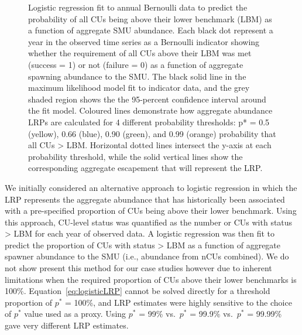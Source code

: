\documentclass[11pt]{book}
\begin{document}
\begin{figure}[htb]

{\centering {} 

}

\caption{Logistic regression fit to annual Bernoulli data to predict the probability of all CUs being above their lower benchmark (LBM) as a function of aggregate SMU abundance. Each black dot represent a year in the observed time series as a Bernoulli indicator showing whether the requirement of all CUs above their LBM was met (success = 1) or not (failure = 0) as a function of aggregate spawning abundance to the SMU. The black solid line in the maximum likelihood model fit to indicator data, and the grey shaded region shows the the 95-percent confidence interval around the fit model. Coloured lines demonstrate how aggregate abundance LRPs are calculated for 4 different probability thresholds: p* = 0.5 (yellow), 0.66 (blue), 0.90 (green), and 0.99 (orange) probability that all CUs > LBM. Horizontal dotted lines intersect the y-axis at each probability threshold, while the solid vertical lines show the corresponding aggregate escapement that will represent the LRP.}\label{fig:example-logisticFit}
\end{figure}
We initially considered an alternative approach to logistic regression in which the LRP represents the aggregate abundance that has historically been associated with a pre-specified proportion of CUs being above their lower benchmark. Using this approach, CU-level status was quantified as the number or CUs with status \textgreater{} LBM for each year of observed data. A logistic regression was then fit to predict the proportion of CUs with status \textgreater{} LBM as a function of aggregate spawner abundance to the SMU (i.e., abundance from nCUs combined). We do not show present this method for our case studies however due to inherent limitations when the required proportion of CUs above their lower benchmarks is 100\%. Equation~\ref{eq:logisticLRP} cannot be solved directly for a threshold proportion of \(p^*\) = 100\%, and LRP estimates were highly sensitive to the choice of \(p^*\) value used as a proxy. Using \(p^*\) = 99\% vs.~\(p^*\) = 99.9\% vs.~\(p^*\) = 99.99\% gave very different LRP estimates.
\end{document}
